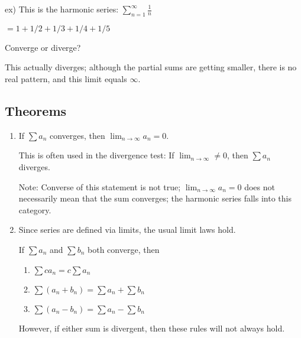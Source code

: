 \documentclass{article}
\begin{document}
ex) This is the harmonic series: $\sum_{n=1}^{\infty}\frac{1}{n}$

$ = 1+1/2+1/3+1/4+1/5$

Converge or diverge?

This actually diverges; although the partial sums are getting smaller, there is no real pattern, and this limit equals $\infty$.


\subsection{Theorems}

\begin{enumerate}
    \item If $\sum a_n$ converges, then $\lim_{n\to\infty} a_n = 0$.

This is often used in the divergence test: If $\lim_{n\to\infty} \neq 0$, then $\sum a_n$ diverges.

Note: Converse of this statement is not true; $\lim_{n\to\infty} a_n = 0$ does not necessarily mean that the sum converges; the harmonic series falls into this category.

\item Since series are defined via limits, the usual limit laws hold. 

If $\sum a_n$ and $\sum b_n$ both converge, then
\begin{enumerate}
    \item $\sum ca_n = c\sum a_n$
    \item $\sum (a_n+b_n) = \sum a_n + \sum b_n$
    \item $\sum (a_n-b_n) = \sum a_n - \sum b_n$
\end{enumerate}

However, if either sum is divergent, then these rules will not always hold.
\end{enumerate}
\end{document}
